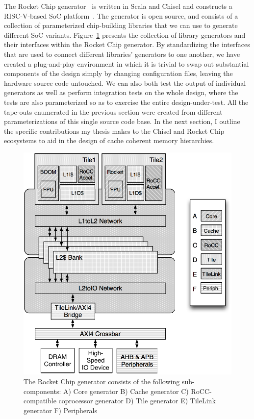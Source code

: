 The Rocket Chip generator~\cite{rocket} is written in Scala and Chisel and constructs a
RISC-V-based SoC platform~\cite{asanovic-riscv-mpreport2014}.
The generator is open source, and consists of a collection of
parameterized chip-building libraries that we can use to generate
different SoC variants.  
Figure~\ref{fig:generators} presents the collection of library generators and their interfaces within the Rocket Chip generator.
By standardizing the interfaces that are used
to connect different libraries' generators to one another, we have
created a plug-and-play environment in which it is trivial to swap out
substantial components of the design simply by changing configuration
files, leaving the hardware source code untouched.  We can also both
test the output of individual generators as well as perform
integration tests on the whole design, where the tests are also
parameterized so as to exercise the entire design-under-test.
All the tape-outs enumerated in the previous section were created from different parameterizations of this single source code base.
In the next section, I outline the specific contributions my thesis makes to the Chisel and Rocket Chip ecosystems to aid in the design of cache coherent memory hierarchies.

\begin{figure}[p]
\centering
\includegraphics[width=0.8\columnwidth]{intro/figures/rocket-chip.pdf}
\caption[Sub-components of the Rocket Chip generator.]{The Rocket Chip generator consists of the following sub-components: A) Core generator B) Cache generator C) RoCC-compatible coprocessor generator D) Tile generator E) TileLink generator F) Peripherals }
\label{fig:generators}
\end{figure}

